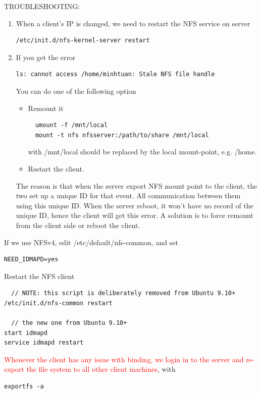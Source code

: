 TROUBLESHOOTING:
\begin{enumerate}
  \item  When a client's IP is changed, we need to restart the NFS service on
  server
\begin{verbatim}
/etc/init.d/nfs-kernel-server restart
\end{verbatim} 

\item If you get the error 
\begin{verbatim}
ls: cannot access /home/minhtuan: Stale NFS file handle
\end{verbatim}
You can do one of the following option
\begin{itemize}
  \item Remount it
  \begin{verbatim}
  umount -f /mnt/local
  mount -t nfs nfsserver:/path/to/share /mnt/local
  \end{verbatim}
  with /mnt/local should be replaced by the local mount-point, e.g. /home.
  
  \item Restart the client. 
\end{itemize}
The reason is that when the server export NFS mount point to the client, the two
set up a unique ID for that event.
All communication between them using this unique ID. When the server reboot, it
won't have no record of the unique ID, hence the client will get this error. A
solution is to force remount from the client side or reboot the client.  
\end{enumerate}

\begin{framed}
If we use NFSv4, edit /etc/default/nfs-common, and set
\begin{verbatim}
NEED_IDMAPD=yes
\end{verbatim}
\end{framed}

Restart the NFS client
\begin{verbatim}
  // NOTE: this script is deliberately removed from Ubuntu 9.10+
/etc/init.d/nfs-common restart

  // the new one from Ubuntu 9.10+
start idmapd
service idmapd restart
\end{verbatim}

\textcolor{red}{Whenever the client has any issue with binding, we login in to
the server and re-export the file system to all other client machines}, with
\begin{verbatim}
exportfs -a
\end{verbatim}



